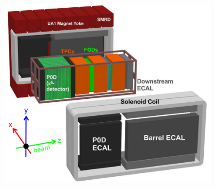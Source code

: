\begin{figure}[htbp]
 \centering
 \includegraphics[width=\linewidth/2]{Chapter2/Figs/Raster/ND280Fig.png} 
 \label{fig:nd280Fig}
\end{figure}

